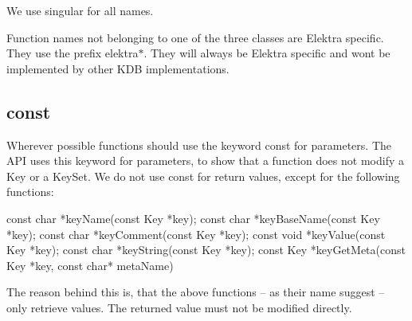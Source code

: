 We use singular for all names.

Function names not belonging to one of the three classes are Elektra specific. They use the prefix {\ttfamily elektra$\ast$}. They will always be Elektra specific and won\textquotesingle{}t be implemented by other K\+DB implementations.

\subsection*{const}

Wherever possible functions should use the keyword {\ttfamily const} for parameters. The A\+PI uses this keyword for parameters, to show that a function does not modify a {\ttfamily Key} or a {\ttfamily Key\+Set}. We do not use {\ttfamily const} for return values, except for the following functions\+: \begin{DoxyVerb}const char *keyName(const Key *key);
const char *keyBaseName(const Key *key);
const char *keyComment(const Key *key);
const void *keyValue(const Key *key);
const char *keyString(const Key *key);
const Key  *keyGetMeta(const Key *key, const char* metaName)
\end{DoxyVerb}


The reason behind this is, that the above functions – as their name suggest – only retrieve values. The returned value must not be modified directly. 